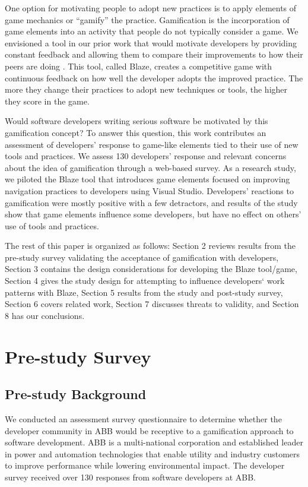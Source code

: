\documentclass{sig-alternate}
\begin{document}
One option for motivating people to adopt new practices is to apply elements of game mechanics or ``gamify'' the practice. Gamification is the incorporation of game elements into an activity that people do not typically consider a game\cite{2013Oxford}.  We envisioned a tool in our prior work that would motivate developers by providing constant feedback and allowing them to compare their improvements to how their peers are doing \cite{Snipes2013Towards}.  This tool, called Blaze, creates a competitive game with continuous feedback on how well the developer adopts the improved practice.  The more they change their practices to adopt new techniques or tools, the higher they score in the game. 

Would software developers writing serious software be motivated by this gamification concept? To answer this question, this work contributes an assessment of developers' response to game-like elements tied to their use of new tools and practices.  We assess 130 developers' response and relevant concerns about the idea of gamification through a web-based survey.  As a research study, we piloted the Blaze tool that introduces game elements focused on improving navigation practices to developers using Visual Studio.  Developers' reactions to gamification were mostly positive with a few detractors, and results of the study show that game elements influence some developers, but have no effect on others' use of tools and practices.

The rest of this paper is organized as follows:  Section 2 reviews results from the pre-study survey validating the acceptance of gamification with developers, Section 3 contains the design considerations for developing the Blaze tool/game, Section 4 gives the study design for attempting to influence developers` work patterns with Blaze, Section 5 results from the study and post-study survey, Section 6 covers related work, Section 7 discusses threats to validity, and Section 8 has our conclusions.

\section{Pre-study Survey}

\subsection{Pre-study Background}

We conducted an assessment survey questionnaire to determine whether the developer community in ABB would be receptive to a gamification approach to software development.  ABB is a multi-national corporation and established leader in power and automation technologies that enable utility and industry customers to improve performance while lowering environmental impact.  The developer survey received over 130 responses from software developers at ABB.
\end{document}

